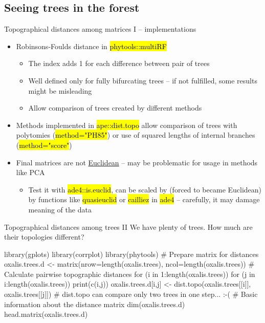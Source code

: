 \documentclass[compress, ucs, xelatex, 11pt, xcolor=svgnames,
  hyperref={
    bookmarks=true,
    unicode=true,
    colorlinks=true,
    pdftitle={Molecular data in R},
    plainpages=false,
    pdfauthor={Vojtech Zeisek},
    pdfsubject={Course about phylogeny and evolution in R},
    pdfcreator={XeLaTeX},
    pdfkeywords={R, evolution, phylogeny, molecular data},
    linkcolor=Tomato,
    anchorcolor=SaddleBrown,
    citecolor=Goldenrod,
    filecolor=DarkMagenta,
    menucolor=Sienna,
    urlcolor=DarkTurquoise,
    pdftex},
  url={hyphens, lowtilde} %
  ]{beamer}
\renewcommand{\texttt}[1]{\hl{\ttfamily #1}}
\begin{document}
\subsection{Seeing trees in the forest}

\begin{frame}{Topographical distances among matrices I -- implementations}
\begin{itemize}
  \item Robinsons-Foulds distance in \texttt{phytools::multiRF}
  \begin{itemize}
    \item The index adds 1 for each difference between pair of trees
    \item Well defined only for fully bifurcating trees -- if not fulfilled, some results might be misleading
    \item Allow comparison of trees created by different methods
  \end{itemize}
  \item Methods implemented in \texttt{ape::dist.topo} allow comparison of trees with polytomies (\texttt{method="PH85"}) or use of squared lengths of internal branches (\texttt{method="score"})
  \item Final matrices are not \href{https://en.wikipedia.org/wiki/Euclidean_distance_matrix}{Euclidean} -- may be problematic for usage in methods like PCA
  \begin{itemize}
    \item Test it with \texttt{ade4::is.euclid}, can be scaled by (forced to became Euclidean) by functions like \texttt{quasieuclid} or \texttt{cailliez} in \texttt{ade4} -- carefully, it may damage meaning of the data
  \end{itemize}
\end{itemize}
\end{frame}

\begin{frame}[fragile]{Topographical distances among trees II}
We have plenty of trees. How much are their topologies different?
  \begin{spluscode}
    library(gplots)
    library(corrplot)
    library(phytools)
    # Prepare matrix for distances
    oxalis.trees.d <- matrix(nrow=length(oxalis.trees),
      ncol=length(oxalis.trees))
    # Calculate pairwise topographic distances
    for (i in 1:length(oxalis.trees)) {
      for (j in i:length(oxalis.trees)) {
        print(c(i,j))
        oxalis.trees.d[i,j] <- dist.topo(oxalis.trees[[i]],
          oxalis.trees[[j]])
      }
    } # dist.topo can compare only two trees in one step... :-(
    # Basic information about the distance matrix
    dim(oxalis.trees.d)
    head.matrix(oxalis.trees.d)
  \end{spluscode}
\end{frame}
\end{document}
